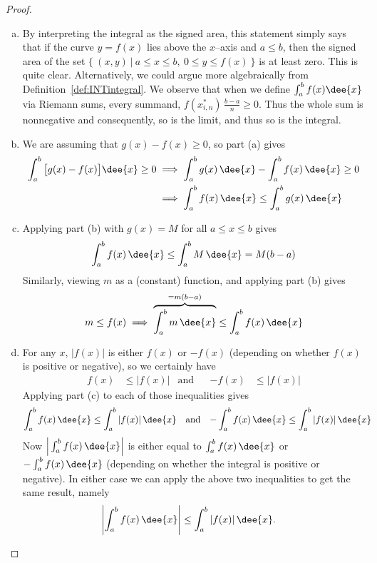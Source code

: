 \begin{proof}
\begin{enumerate}[(a)]
 \item By interpreting the integral as the signed area, this statement
simply says that if the curve $y=f(x)$ lies above the
$x$--axis and $a\le b$, then the signed area of the set
$\big\{\ (x,y)\ \big|\ a\le x\le b,\   0\le y\le f(x)\ \big\}$
is at least zero. This is quite clear. Alternatively, we could argue more
algebraically from Definition~\ref{def:INTintegral}. We observe that when we
define $\int_a^b f(x)\dee{x}$ via Riemann sums, every
summand, $f(x_{i,n}^*)\,\frac{b-a}{n}\ge 0$. Thus the whole sum is nonnegative
and consequently, so is the limit, and thus so is the integral.

\item We are assuming that $g(x)-f(x)\geq 0$, so part (a) gives
\begin{align*}
\int_a^b\big[g(x)-f(x)\big]\dee{x}\ge 0
&\implies \int_a^b g(x)\,\dee{x}-\int_a^b f(x)\,\dee{x}\ge 0 \\
&\implies \int_a^b f(x)\,\dee{x} \le \int_a^b g(x)\,\dee{x}
\end{align*}

\item Applying part (b) with $g(x)=M$ for all $a\le x\le b$ gives
\begin{align*}
\int_a^b f(x)\,\dee{x} \le \int_a^b M\,\dee{x} = M(b-a)
\end{align*}
Similarly, viewing $m$ as a (constant) function, and applying part (b) 
gives
\begin{align*}
m\le f(x) \implies \overbrace{\int_a^bm\,\dee{x}}^{=m(b-a)} \le 
\int_a^b f(x)\,\dee{x}
\end{align*}


\item  For any $x$, $|f(x)|$ is either $f(x)$ or $-f(x)$ (depending on whether
$f(x)$ is positive or negative), so we certainly have
\begin{align*}
f(x)&\le |f(x)| & \text{and}&&
-f(x)&\le |f(x)|
\end{align*}
Applying part (c) to each of those inequalities gives
\begin{align*}
\int_a^b f(x)\,\dee{x} &\le \int_a^b |f(x)|\,\dee{x} & \text{and} &&
-\int_a^b f(x)\,\dee{x} &\le \int_a^b |f(x)|\,\dee{x}
\end{align*}
Now $\Big|\int_a^b f(x)\,\dee{x}\Big|$ is either equal to $\int_a^b f(x)\,\dee{x}$ or
$-\int_a^b f(x)\,\dee{x}$ (depending on whether the integral is positive or
negative). In either case we can apply the above two inequalities to get the
same result, namely
\begin{align*}
  \left|\int_a^b f(x)\,\dee{x}\right| &\leq \int_a^b |f(x)|\,\dee{x}.
\end{align*}
\end{enumerate}
\end{proof}

